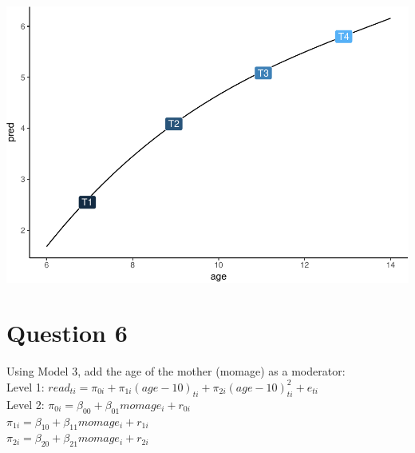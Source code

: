 \documentclass[]{article}
\begin{document}
\includegraphics{Beck_HW_6_R_1_files/figure-latex/unnamed-chunk-8-1.pdf}

\section{Question 6}\label{question-6}

Using Model 3, add the age of the mother (momage) as a moderator:\\
Level 1:
\(read_{ti} = \pi_{0i} + \pi_{1i}(age-10)_{ti} + \pi_{2i}(age-10)^2_{ti} + e_{ti}\)\\
Level 2: \(\pi_{0i} = \beta_{00} + \beta_{01}momage_i + r_{0i}\)\\
\(\pi_{1i} = \beta_{10} + \beta_{11}momage_i + r_{1i}\)\\
\(\pi_{2i} = \beta_{20} + \beta_{21}momage_i + r_{2i}\)
\end{document}
